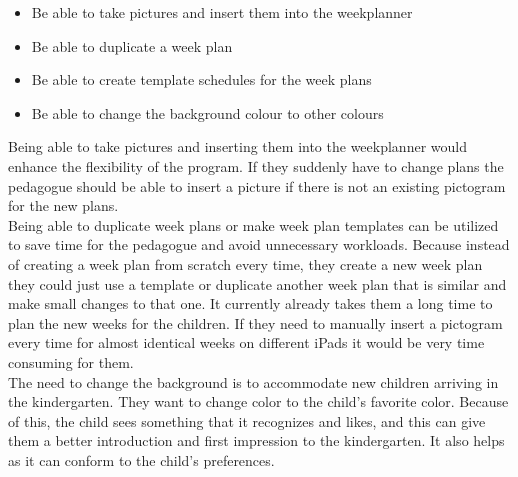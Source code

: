 \begin{itemize}
    \item Be able to take pictures and insert them into the weekplanner
    \item Be able to duplicate a week plan
    \item Be able to create template schedules for the week plans
    \item Be able to change the background colour to other colours
\end{itemize}
\noindent
Being able to take pictures and inserting them into the weekplanner would enhance the flexibility of the program.
If they suddenly have to change plans the pedagogue should be able to insert a picture if there is not an existing pictogram for the new plans.
\\
Being able to duplicate week plans or make week plan templates can be utilized to save time for the pedagogue and avoid unnecessary workloads.
Because instead of creating a week plan from scratch every time, they create a new week plan they could just use a template or duplicate another week plan that is similar and make small changes to that one. 
It currently already takes them a long time to plan the new weeks for the children. 
If they need to manually insert a pictogram every time for almost identical weeks on different iPads it would be very time consuming for them.
\\
The need to change the background is to accommodate new children arriving in the kindergarten. 
They want to change color to the child's favorite color. 
Because of this, the child sees something that it recognizes and likes, and this can give them a better introduction and first impression to the kindergarten.
It also helps as it can conform to the child's preferences.
